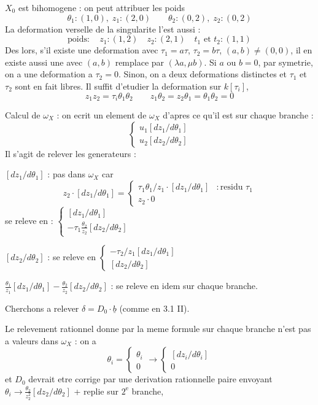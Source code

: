 \documentclass[11pt,a4paper]{article}
\theoremstyle{plain}
\theoremstyle{definition}
\begin{document}
$X_0$ est bihomogene : on peut attribuer les poids
\[
\theta_1 : (1,0), \; z_1 : (2,0) \qquad \theta_2 : (0,2), \; z_2 : (0,2)
\]
La deformation verselle de la singularite l'est aussi :
\[
\text{poids} : \quad z_1 : (1,2) \quad z_2 : (2,1) \quad t_1 \text{ et } t_2 : (1,1)
\]
Des lors, s'il existe une deformation avec $\tau_1 = a\tau$, $\tau_2 = b\tau$, $(a,b) \neq (0,0)$, il en existe aussi une avec $(a,b)$ remplace par $(\lambda a, \mu b)$. Si $a$ ou $b = 0$, par symetrie, on a une deformation a $\tau_2 = 0$. Sinon, on a deux deformations distinctes et $\tau_1$ et $\tau_2$ sont en fait libres. Il suffit d'etudier la deformation sur $k[\tau_i]$,
\[
z_1 z_2 = \tau_i \theta_1 \theta_2 \qquad z_1 \theta_2 = z_2 \theta_1 = \theta_1 \theta_2 = 0
\]

Calcul de $\omega_X$ : on ecrit un element de $\omega_X$ d'apres ce qu'il est sur chaque branche :
\[
\begin{cases} u_1 [dz_1/d\theta_1] \\ u_2 [dz_2/d\theta_2] \end{cases}
\]
Il s'agit de relever les generateurs :

$[dz_1/d\theta_1]$ : pas dans $\omega_X$ car
\[
z_2 \cdot [dz_1/d\theta_1] = \begin{cases} \tau_1 \theta_1/z_1 \cdot [dz_1/d\theta_1] & : \text{residu } \tau_1 \\ z_2 \cdot 0 \end{cases}
\]
se releve en : $\begin{cases} [dz_1/d\theta_1] \\ -\tau_1 \frac{\theta_2}{z_2} [dz_2/d\theta_2] \end{cases}$

$[dz_2/d\theta_2]$ : se releve en $\begin{cases} -\tau_2/z_1 [dz_1/d\theta_1] \\ [dz_2/d\theta_2] \end{cases}$

$\frac{\theta_1}{z_1}[dz_1/d\theta_1] - \frac{\theta_2}{z_2}[dz_2/d\theta_2]$ : se releve en idem sur chaque branche.

\newpage

Cherchons a relever $\delta = D_0 \cdot \underline{b}$ (comme en 3.1 II).

Le relevement rationnel donne par la meme formule sur chaque branche n'est pas a valeurs dans $\omega_X$ : on a
\[
\theta_i = \begin{cases} \theta_i \\ 0 \end{cases} \longrightarrow \begin{cases} [dz_i/d\theta_i] \\ 0 \end{cases}
\]
et $D_0$ devrait etre corrige par une derivation rationnelle paire envoyant $\theta_i \to \frac{\theta_2}{z_2^2}[dz_2/d\theta_2]$ + replie sur $2^{\text{e}}$ branche,
\end{document}
